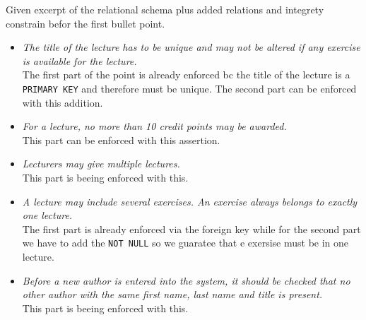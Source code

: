 \documentclass{article}
\begin{document}
\printfront


\task{}
Given excerpt of the relational schema plus added relations and integrety constrain befor the first bullet point.

\newpage
\begin{itemize}
    \item 
    \textit{The title of the lecture has to be unique and may not be altered if any exercise is
    available for the lecture.}\\
    The first part of the point is already enforced bc the title of the lecture is a \texttt{PRIMARY KEY} and therefore must be unique. The second part can be enforced with this addition.
    
    \item 
    \textit{For a lecture, no more than 10 credit points may be awarded.}\\
    This part can be enforced with this assertion.
    
    \item 
    \textit{Lecturers may give multiple lectures.}\\
    This part is beeing enforced with this.
    
    \item 
    \textit{A lecture may include several exercises. An exercise always belongs to exactly one
    lecture.}\\
    The first part is already enforced via the foreign key while for the second part we have to add the \texttt{NOT NULL} so we guaratee that e exersise must be in one lecture.
    
    \item 
    \textit{Before a new author is entered into the system, it should be checked that no other
    author with the same first name, last name and title is present.}\\
    This part is beeing enforced with this.
    

\end{itemize}


\end{document}
